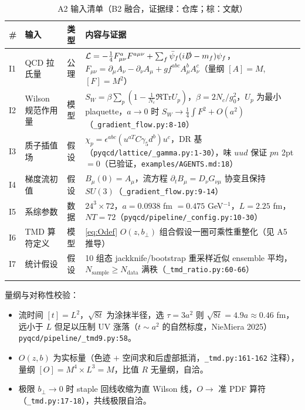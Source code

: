 \documentclass[UTF8]{ctexart}
\begin{document}
\small
\begin{xltabular}{\textwidth}{lllX}
\toprule
\# & 输入 & 类型 & 内容与证据 \\
\midrule
\endhead
I1 & QCD 拉氏量 & 公理 & $\mathcal{L}= -\frac14 F^{a}_{\mu\nu}F^{a\mu\nu}+\sum_f \bar\psi_f(i\slashed{D}-m_f)\psi_f$，$F_{\mu\nu}= \partial_\mu A_\nu-\partial_\nu A_\mu+gf^{abc}A^b_\mu A^c_\nu$（量纲 $[A]=M$, $[F]=M^2$） \\
I2 & Wilson 规范作用量 & 模型 & $S_W=\beta\sum_p (1-\frac1{N_c}\Re\mathrm{Tr} U_p)$，$\beta=2N_c/g_0^2$，$U_p$ 为最小 plaquette，$a\to0$ 时 $S_W\to \frac14\int F^2+O(a^2)$（\texttt{\nolinkurl{\_gradient\_flow.py:8-10}}） \\
I3 & 质子插值场 & 假设 & $\chi_p=\epsilon^{abc}(u^{aT}C\gamma_5 d^b)u^c$，DR 基（\texttt{\nolinkurl{pyqcd/lattice/\_gamma.py:1-30}}），味 $uud$ 保证 $pn$ 2pt$=0$（已验证，\texttt{\nolinkurl{examples/AGENTS.md:18}}） \\
I4 & 梯度流初值 & 假设 & $B_\mu(0)=A_\mu$，流方程 $\partial_t B_\mu = D_\nu G_{\nu\mu}$ 协变且保持 $SU(3)$（\texttt{\nolinkurl{\_gradient\_flow.py:9-14}}） \\
I5 & 系综参数 & 数据 & $24^3\times72$，$a=0.0938$ fm $=0.475$ GeV$^{-1}$，$L=2.25$ fm，$NT=72$（\texttt{\nolinkurl{pyqcd/pipeline/\_config.py:10-30}}） \\
I6 & TMD 算符定义 & 模型 & \eqref{eq:Odef} $O(z,b_\perp)$ 组合假设一圈可乘性重整化（见 A5 推导） \\
I7 & 统计假设 & 假设 & 10 组态 jackknife/bootstrap 重采样近似 ensemble 平均，$N_{\text{sample}}\ge N_{\text{data}}$ 满秩（\texttt{\nolinkurl{\_tmd\_ratio.py:60-66}}） \\
\bottomrule
\caption{A2 输入清单（B2 融合，证据绿：仓库；棕：文献）}
\end{xltabular}

量纲与对称性校验：
\begin{itemize}
\item 流时间 $[t]=L^2$，$\sqrt{8t}$ 为涂抹半径，选 $\tau=3a^2$ 则 $\sqrt{8t}=4.9a\approx0.46$ fm，远小于 $L$ 但足以压制 UV 涨落（$t\sim a^2$ 的自然标度，NieMiera 2025）\textcolor{evidence}{\texttt{\nolinkurl{pyqcd/pipeline/\_tmd9.py:58}}}。
\item $O(z,b)$ 为实标量（色迹 $+$ 空间求和后虚部抵消，\texttt{\nolinkurl{\_tmd.py:161-162}} 注释），量纲 $[O]=M^4\times L^3 = M$，比值 $R$ 无量纲，自洽。
\item 极限 $b_\perp\to0$ 时 staple 回线收缩为直 Wilson 线，$O\to$ 准 PDF 算符（\texttt{\nolinkurl{\_tmd.py:17-18}}），共线极限自洽。
\end{itemize}
\end{document}
